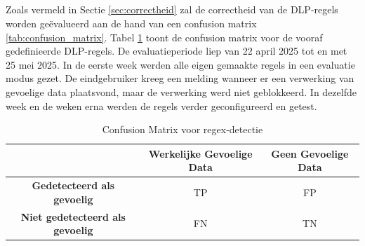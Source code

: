 \subsection{}
\label{sec:functionaliteit-resultaten-vooraf}


\subsection{}
\label{sec:correctheid-resultaten-vooraf}

Zoals vermeld in Sectie \ref{sec:correctheid} zal de correctheid van de DLP-regels worden geëvalueerd aan de hand van een confusion matrix \ref{tab:confusion_matrix}. 
Tabel \ref{tab:confusion_matrix-vooraf} toont de confusion matrix voor de vooraf gedefinieerde DLP-regels. 
De evaluatieperiode liep van 22 april 2025 tot en met 25 mei 2025. 
In de eerste week werden alle eigen gemaakte regels in een evaluatie modus gezet. 
De eindgebruiker kreeg een melding wanneer er een verwerking van gevoelige data plaatsvond, maar de verwerking werd niet geblokkeerd. 
In dezelfde week en de weken erna werden de regels verder geconfigureerd en getest. 


\begin{table}[h]
    \centering
    \small
    \scriptsize
    \begin{tabular}{|c|c|c|}
        \hline
        \textbf{} & \textbf{Werkelijke Gevoelige Data} & \textbf{Geen Gevoelige Data} \\ \hline
        \textbf{Gedetecteerd als gevoelig} & TP & FP \\ \hline
        \textbf{Niet gedetecteerd als gevoelig} & FN & TN \\ \hline
    \end{tabular}
    \caption{Confusion Matrix voor regex-detectie}
    \label{tab:confusion_matrix-vooraf}
\end{table}


\subsubsection{}
\label{}


